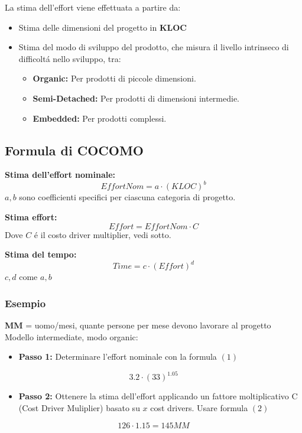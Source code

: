 \documentclass[11pt]{article}
\begin{document}
La stima dell'effort viene effettuata a partire da:
\begin{itemize}
\item Stima delle dimensioni del progetto in \textbf{\textbf{KLOC}}
\item Stima del modo di sviluppo del prodotto, che misura il livello intrinseco di difficoltá nello sviluppo, tra:
\begin{itemize}
\item \textbf{\textbf{Organic:}} Per prodotti di piccole dimensioni.
\item \textbf{\textbf{Semi-Detached:}} Per prodotti di dimensioni intermedie.
\item \textbf{\textbf{Embedded:}} Per prodotti complessi.
\end{itemize}
\end{itemize}
\subsection{Formula di COCOMO}
\label{sec:orgbdd7cef}
\textbf{\textbf{Stima dell'effort nominale:}}
\begin{equation}
EffortNom = a \cdot (KLOC)^{b}
\end{equation}
\(a,b\) sono coefficienti specifici per ciascuna categoria di progetto.

\textbf{\textbf{Stima effort:}}
\begin{equation}
Effort = EffortNom \cdot C
\end{equation}
Dove \(C\) é il costo driver multiplier, vedi sotto.

\textbf{\textbf{Stima del tempo:}}
\begin{equation}
Time = c \cdot (Effort)^{d}
\end{equation}
\(c,d\) come \(a,b\)
\subsubsection{Esempio}
\label{sec:orgabc41ae}
\textbf{\textbf{MM}} = uomo/mesi, quante persone per mese devono lavorare al progetto
Modello intermediate, modo organic:
\begin{itemize}
\item \textbf{\textbf{Passo 1:}} Determinare l'effort nominale con la formula \((1)\)
\end{itemize}
$$3.2\cdot(33)^{1.05}$$

\begin{itemize}
\item \textbf{\textbf{Passo 2:}} Ottenere la stima dell'effort applicando un fattore moltiplicativo C (Cost Driver Muliplier) basato su \(x\) cost drivers. Usare formula \((2)\)
\end{itemize}
$$126 \cdot 1.15 = 145MM$$
\end{document}
